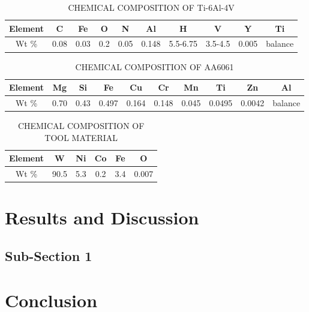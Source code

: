 \documentclass[preprint]{elsarticle}
\begin{document}
\begin{table}[!htbp]
\caption{CHEMICAL COMPOSITION OF Ti-6Al-4V}
\centering
\begin{tabular}{|c|c|c|c|c|c|c|c|c|c|}
\hline 
Element & C & Fe & O & N & Al & H & V & Y & Ti\\ 
\hline 
Wt \% & 0.08 & 0.03 & 0.2 & 0.05 & 0.148 & 5.5-6.75 & 3.5-4.5 & 0.005 & balance\\ 
\hline 
\end{tabular}
\label{table:Ti-6Al-4V-composition} %
\end{table}


\begin{table*}[!htbp]
\caption{CHEMICAL COMPOSITION OF AA6061}
\centering
\begin{tabular}{|c|c|c|c|c|c|c|c|c|c|}
\hline 
Element & Mg & Si & Fe & Cu & Cr & Mn & Ti & Zn & Al\\ 
\hline 
Wt \% & 0.70 & 0.43 & 0.497 & 0.164 & 0.148 & 0.045 & 0.0495 & 0.0042 & balance\\ 
\hline 
\end{tabular}
\label{table:AA6061-composition} %
\end{table*}



\begin{table*}[!htbp]
\caption{CHEMICAL COMPOSITION OF TOOL MATERIAL}
\centering
\begin{tabular}{|c|c|c|c|c|c|}
\hline 
Element & W & Ni & Co & Fe & O \\ 
\hline 
Wt \% & 90.5 & 5.3 & 0.2 & 3.4 & 0.007 \\ 
\hline 
\end{tabular}
\label{table:tool-composition} %
\end{table*}

\section{Results and Discussion}
\label{sec:Results and Discussion}
\subsection{Sub-Section 1}

\section{Conclusion}
\label{sec:Conclusion}
\end{document}
